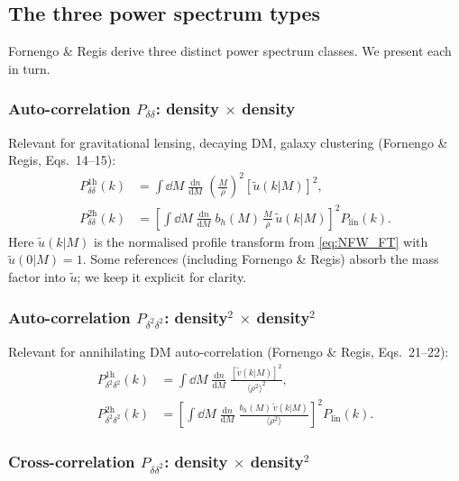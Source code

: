 \documentclass[10pt,a4paper]{article}
\newcommand{\ddn}{\frac{\mathrm{d}n}{\mathrm{d}M}}
\newcommand{\rhobar}{\bar{\rho}}
\newcommand{\Plin}{P_{\mathrm{lin}}}
\newcommand{\utilde}{\tilde{u}}
\newcommand{\vtilde}{\tilde{v}}
\begin{document}
\subsection{The three power spectrum types}

Fornengo \& Regis derive three distinct power spectrum classes. We present each in turn.

\subsubsection{Auto-correlation $P_{\delta\delta}$: density $\times$ density}

Relevant for gravitational lensing, decaying DM, galaxy clustering (Fornengo \& Regis, Eqs.~14--15):
\begin{align}
\label{eq:Pdd_1h}
P_{\delta\delta}^{\mathrm{1h}}(k) &= \int \dd M \; \ddn \; \left(\frac{M}{\rhobar}\right)^2 [\utilde(k | M)]^2, \\
\label{eq:Pdd_2h}
P_{\delta\delta}^{\mathrm{2h}}(k) &= \left[\int \dd M \; \ddn \; b_h(M) \, \frac{M}{\rhobar} \, \utilde(k | M)\right]^2 \Plin(k).
\end{align}
Here $\utilde(k|M)$ is the normalised profile transform from \cref{eq:NFW_FT} with $\utilde(0|M) = 1$. Some references (including Fornengo \& Regis) absorb the mass factor into $\utilde$; we keep it explicit for clarity.

\subsubsection{Auto-correlation $P_{\delta^2 \delta^2}$: density$^2$ $\times$ density$^2$}

Relevant for annihilating DM auto-correlation (Fornengo \& Regis, Eqs.~21--22):
\begin{align}
\label{eq:Pd2d2_1h}
P_{\delta^2 \delta^2}^{\mathrm{1h}}(k) &= \int \dd M \; \ddn \; \frac{[\vtilde(k | M)]^2}{\langle \rho^2 \rangle^2}, \\
\label{eq:Pd2d2_2h}
P_{\delta^2 \delta^2}^{\mathrm{2h}}(k) &= \left[\int \dd M \; \ddn \; \frac{b_h(M) \, \vtilde(k | M)}{\langle \rho^2 \rangle}\right]^2 \Plin(k).
\end{align}

\subsubsection{Cross-correlation $P_{\delta \delta^2}$: density $\times$ density$^2$}
\end{document}
